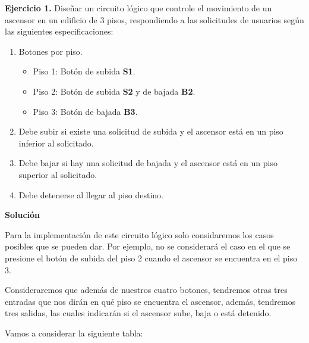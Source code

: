 \textbf{Ejercicio 1.} Diseñar un circuito lógico que controle el movimiento de un 
ascensor en un edificio de 3 pisos, respondiendo a las solicitudes de usuarios 
según las siguientes especificaciones:

\begin{enumerate}[label=\alph*)]
    \item Botones por piso.
        \begin{itemize}
            \item Piso 1: Botón de subida \textbf{S1}.
            \item Piso 2: Botón de subida \textbf{S2} y de bajada \textbf{B2}.
            \item Piso 3: Botón  de bajada \textbf{B3}.
        \end{itemize}
    \item Debe subir si existe una solicitud de subida y el ascensor está en un piso inferior al solicitado.
    \item Debe bajar si hay una solicitud de bajada y el ascensor está en un piso superior al solicitado.
    \item Debe detenerse al llegar al piso destino.
\end{enumerate}

\textbf{Solución}

Para la implementación de este circuito lógico solo considaremos los casos posibles que se pueden dar. Por 
ejemplo, no se considerará el caso en el que se presione el botón de subida del piso 2 cuando el ascensor 
se encuentra en el piso 3. 

Consideraremos que además de nuestros cuatro botones, tendremos otras tres entradas que nos dirán en qué 
piso se encuentra el ascensor, además, tendremos tres salidas, las cuales indicarán si el ascensor sube, baja o 
está detenido.

Vamos a considerar la siguiente tabla:

